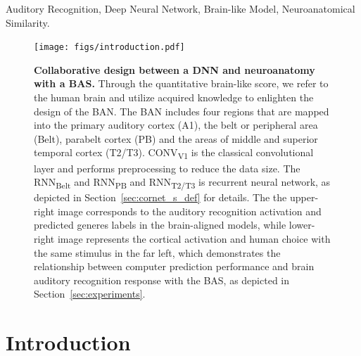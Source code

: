 \documentclass[journal]{IEEEtran}
\begin{document}
\begin{IEEEkeywords} 
Auditory Recognition, Deep Neural Network, Brain-like Model, Neuroanatomical Similarity. 
\end{IEEEkeywords}


%
\IEEEpeerreviewmaketitle



\begin{figure}
	\centering
	\texttt{[image: figs/introduction.pdf]}
	\caption{
		\textbf{
		Collaborative design between a DNN and neuroanatomy with a BAS.} 
		Through the quantitative brain-like score, we refer to the human brain and utilize acquired knowledge to enlighten the design of the BAN. 
		The BAN includes four regions that are mapped into the primary auditory cortex (A1), the belt or peripheral area (Belt), parabelt cortex (PB) and the areas of middle and superior temporal cortex (T2/T3). 
		CONV\textsubscript{V1} is the classical convolutional layer and performs preprocessing to reduce the data size.
		The RNN\textsubscript{Belt} and RNN\textsubscript{PB} and RNN\textsubscript{T2/T3} is recurrent neural network, as depicted in Section~\ref{sec:cornet_s_def} for details.
		The the upper-right image corresponds to the auditory recognition activation and predicted generes labels in the brain-aligned models, 
		while lower-right image represents the cortical activation and human choice with the same stimulus in the far left,
		which demonstrates the relationship between computer prediction performance and brain auditory recognition response with the BAS, as depicted in Section~\ref{sec:experiments}.
	}
	\label{fig:introduction}
\end{figure}


\section{Introduction}
% 
% 
% 
% 
\end{document}
